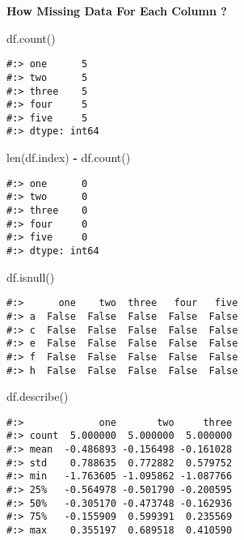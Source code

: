 \documentclass[
]{book}
\newenvironment{Shaded}{\begin{snugshade}}{\end{snugshade}}
\newcommand{\BuiltInTok}[1]{#1}
\newcommand{\NormalTok}[1]{#1}
\newcommand{\OperatorTok}[1]{\textcolor[rgb]{0.43,0.43,0.43}{\textbf{#1}}}
\begin{document}
\textbf{How Missing Data For Each Column ?}

\begin{Shaded}
\begin{Highlighting}[]
\NormalTok{df.count()}
\end{Highlighting}
\end{Shaded}

\begin{verbatim}
#:> one      5
#:> two      5
#:> three    5
#:> four     5
#:> five     5
#:> dtype: int64
\end{verbatim}

\begin{Shaded}
\begin{Highlighting}[]
\BuiltInTok{len}\NormalTok{(df.index) }\OperatorTok{{-}}\NormalTok{ df.count()}
\end{Highlighting}
\end{Shaded}

\begin{verbatim}
#:> one      0
#:> two      0
#:> three    0
#:> four     0
#:> five     0
#:> dtype: int64
\end{verbatim}

\begin{Shaded}
\begin{Highlighting}[]
\NormalTok{df.isnull()}
\end{Highlighting}
\end{Shaded}

\begin{verbatim}
#:>      one    two  three   four   five
#:> a  False  False  False  False  False
#:> c  False  False  False  False  False
#:> e  False  False  False  False  False
#:> f  False  False  False  False  False
#:> h  False  False  False  False  False
\end{verbatim}

\begin{Shaded}
\begin{Highlighting}[]
\NormalTok{df.describe()}
\end{Highlighting}
\end{Shaded}

\begin{verbatim}
#:>             one       two     three
#:> count  5.000000  5.000000  5.000000
#:> mean  -0.486893 -0.156498 -0.161028
#:> std    0.788635  0.772882  0.579752
#:> min   -1.763605 -1.095862 -1.087766
#:> 25%   -0.564978 -0.501790 -0.200595
#:> 50%   -0.305170 -0.473748 -0.162936
#:> 75%   -0.155909  0.599391  0.235569
#:> max    0.355197  0.689518  0.410590
\end{verbatim}
\end{document}

